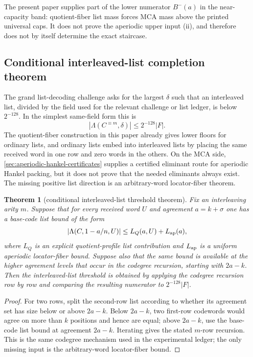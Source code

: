 \documentclass[11pt]{article}
\newtheorem{theorem}{Theorem}[section]
\theoremstyle{definition}
\theoremstyle{remark}
\begin{document}
The present paper supplies part of the lower numerator $B^-(a)$ in the
near-capacity band: quotient-fiber list mass forces MCA mass above the printed
universal caps.  It does not prove the aperiodic upper input (ii), and therefore
does not by itself determine the exact staircase.

\subsection{Conditional interleaved-list completion theorem}

The grand list-decoding challenge asks for the largest $\delta$ such that an
interleaved list, divided by the field used for the relevant challenge or list
ledger, is below $2^{-128}$.  In the simplest same-field form this is
\[
        |\Lambda(C^{\equiv m},\delta)|\le 2^{-128}|F| .
\]
The quotient-fiber construction in this paper already gives lower floors for
ordinary lists, and ordinary lists embed into interleaved lists by placing the
same received word in one row and zero words in the others.  On the MCA side,
\cref{sec:aperiodic-hankel-certificates} supplies a certified eliminant route
for aperiodic Hankel packing, but it does not prove that the needed eliminants
always exist.  The missing positive list direction is an arbitrary-word
locator-fiber theorem.

\begin{theorem}[conditional interleaved-list threshold theorem]\label{thm:conditional-list}
Fix an interleaving arity $m$.  Suppose that for every received word $U$ and
agreement $a=k+\sigma$ one has a base-code list bound of the form
\[
        |\Lambda(C,1-a/n,U)|
        \le
        L_Q(a,U)+L_{\rm ap}(a),
\]
where $L_Q$ is an explicit quotient-profile list contribution and
$L_{\rm ap}$ is a uniform aperiodic locator-fiber bound.  Suppose also that the
same bound is available at the higher agreement levels that occur in the
codegree recursion, starting with $2a-k$.  Then the interleaved-list threshold is
obtained by applying the codegree recursion row by row and comparing the
resulting numerator to $2^{-128}|F|$.
\end{theorem}

\begin{proof}
For two rows, split the second-row list according to whether its agreement set
has size below or above $2a-k$.  Below $2a-k$, two first-row codewords would
agree on more than $k$ positions and hence are equal; above $2a-k$, use the
base-code list bound at agreement $2a-k$.  Iterating gives the stated $m$-row
recursion.  This is the same codegree mechanism used in the experimental ledger;
the only missing input is the arbitrary-word locator-fiber bound.
\end{proof}
\end{document}
